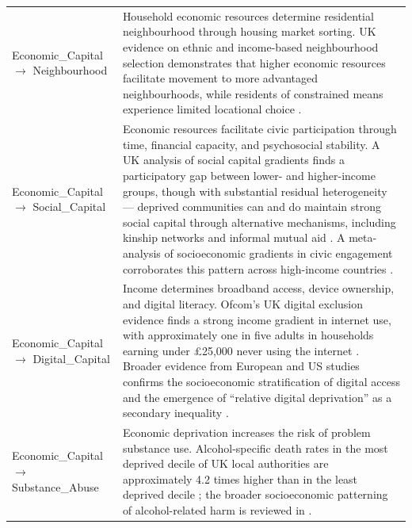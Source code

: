 \begin{longtable}{@{}p{3.8cm}p{11.2cm}@{}}
\addlinespace
Economic\_Capital $\to$ Neighbourhood & Household economic resources determine residential neighbourhood through housing market sorting. UK evidence on ethnic and income-based neighbourhood selection demonstrates that higher economic resources facilitate movement to more advantaged neighbourhoods, while residents of constrained means experience limited locational choice \citep{coulter_ethnic_2019, bailey_remaking_2017}. \\
\addlinespace
Economic\_Capital $\to$ Social\_Capital & Economic resources facilitate civic participation through time, financial capacity, and psychosocial stability. A UK analysis of social capital gradients finds a participatory gap between lower- and higher-income groups, though with substantial residual heterogeneity — deprived communities can and do maintain strong social capital through alternative mechanisms, including kinship networks and informal mutual aid \citep{nazroo_civic_2023}. A meta-analysis of socioeconomic gradients in civic engagement corroborates this pattern across high-income countries \citep{neumayr_how_2023}. \\
\addlinespace
Economic\_Capital $\to$ Digital\_Capital & Income determines broadband access, device ownership, and digital literacy. Ofcom's UK digital exclusion evidence finds a strong income gradient in internet use, with approximately one in five adults in households earning under £25{,}000 never using the internet \citep{ofcom_digital_2022}. Broader evidence from European and US studies confirms the socioeconomic stratification of digital access and the emergence of ``relative digital deprivation'' as a secondary inequality \citep{seifert_digital_2024}. \\
\addlinespace
Economic\_Capital $\to$ Substance\_Abuse & Economic deprivation increases the risk of problem substance use. Alcohol-specific death rates in the most deprived decile of UK local authorities are approximately 4.2 times higher than in the least deprived decile \citep{advisory_council_on_the_misuse_of_drugs_vulnerability_2018}; the broader socioeconomic patterning of alcohol-related harm is reviewed in \citet{collins_associations_2016}. \\
\end{longtable}


